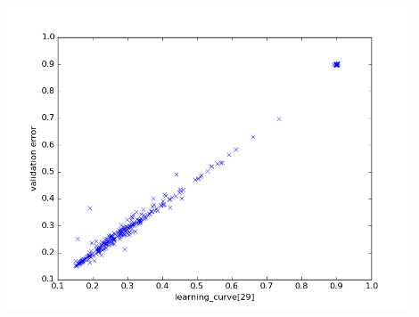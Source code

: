 \documentclass[a4paper,10pt]{article}
\begin{document}
\includegraphics[width=0.9\textwidth]{../../figures/learning_curve29}
\end{document}
